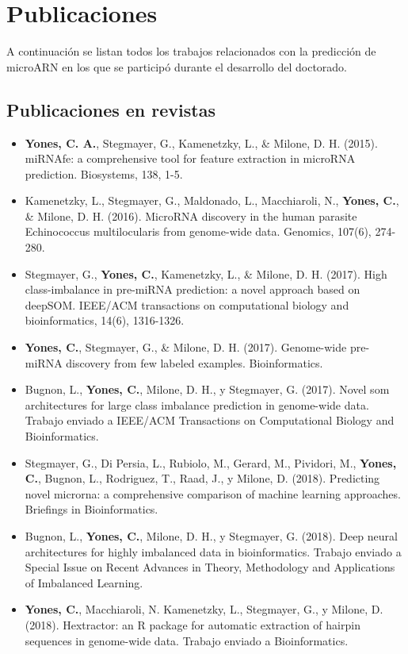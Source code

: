 \chapter{Publicaciones}
A continuación se listan todos los trabajos relacionados con la predicción de microARN en los que se participó durante el desarrollo del doctorado.

\section*{Publicaciones en revistas}
\begin{itemize}
	\item \textbf{Yones, C. A.}, Stegmayer, G., Kamenetzky, L., \& Milone, D. H. (2015). miRNAfe: a comprehensive tool for feature extraction in microRNA
		prediction. Biosystems, 138, 1-5.
	\item Kamenetzky, L., Stegmayer, G., Maldonado, L., Macchiaroli, N., \textbf{Yones, C.}, \& Milone, D. H. (2016). MicroRNA discovery in the human
		parasite Echinococcus multilocularis from genome-wide data. Genomics, 107(6), 274-280.
	\item Stegmayer, G., \textbf{Yones, C.}, Kamenetzky, L., \& Milone, D. H. (2017). High class-imbalance in pre-miRNA prediction: a novel approach based
		on deepSOM. IEEE/ACM transactions on computational biology and bioinformatics, 14(6), 1316-1326.
	\item \textbf{Yones, C.}, Stegmayer, G., \& Milone, D. H. (2017). Genome-wide pre-miRNA discovery from few labeled examples. Bioinformatics.
	\item Bugnon, L., \textbf{Yones, C.}, Milone, D. H., y Stegmayer, G. (2017). Novel som architectures for large class imbalance prediction in genome-wide
		data. Trabajo enviado a IEEE/ACM Transactions on Computational Biology and Bioinformatics.
	\item Stegmayer, G., Di Persia, L., Rubiolo, M., Gerard, M., Pividori, M., \textbf{Yones, C.}, Bugnon, L., Rodriguez, T., Raad, J., y Milone, D. (2018).
		Predicting novel microrna: a comprehensive comparison of machine learning approaches. Briefings in Bioinformatics.
	\item Bugnon, L., \textbf{Yones, C.}, Milone, D. H., y Stegmayer, G. (2018). Deep neural architectures for highly imbalanced data in bioinformatics.
		Trabajo enviado a Special Issue on Recent Advances in Theory, Methodology and Applications of Imbalanced Learning.
	\item \textbf{Yones, C.}, Macchiaroli, N. Kamenetzky, L., Stegmayer, G., y Milone, D. (2018). Hextractor: an R package for automatic extraction of
		hairpin sequences in genome-wide data. Trabajo enviado a Bioinformatics.
\end{itemize}

